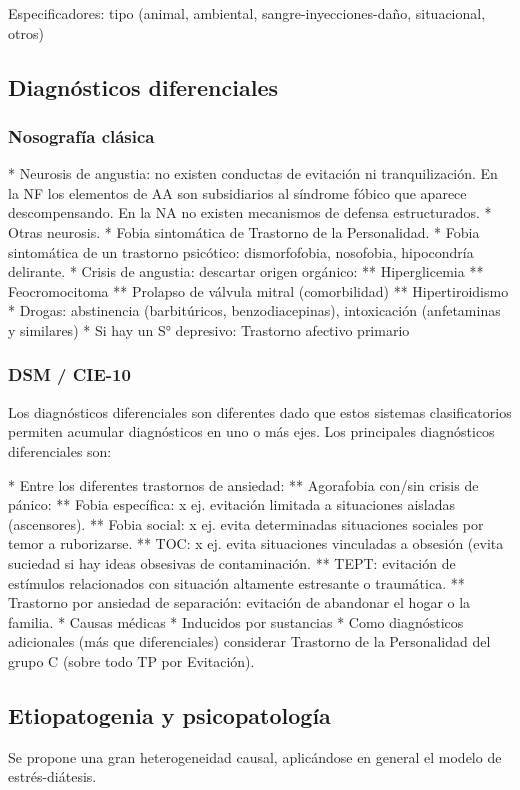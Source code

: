 \documentclass{scrbook}
\begin{document}
Especificadores: tipo (animal, ambiental, sangre-inyecciones-daño, situacional, otros)

\subsection*{Diagnósticos diferenciales}
\subsubsection*{Nosografía clásica}
* Neurosis de angustia: no existen conductas de evitación ni tranquilización. En la NF los elementos de AA son subsidiarios al síndrome fóbico que aparece descompensando. En la NA no existen mecanismos de defensa estructurados.
* Otras neurosis.
* Fobia sintomática de Trastorno de la Personalidad.
* Fobia sintomática de un trastorno psicótico: dismorfofobia, nosofobia, hipocondría delirante.
* Crisis de angustia: descartar origen orgánico:
** Hiperglicemia
** Feocromocitoma
** Prolapso de válvula mitral (comorbilidad)
** Hipertiroidismo
* Drogas: abstinencia (barbitúricos, benzodiacepinas), intoxicación (anfetaminas y similares)
* Si hay un S° depresivo: Trastorno afectivo primario
\subsubsection*{DSM / CIE-10}
Los diagnósticos diferenciales son diferentes dado que estos sistemas clasificatorios permiten acumular diagnósticos en uno o más ejes. Los principales diagnósticos diferenciales son:

* Entre los diferentes trastornos de ansiedad:
** Agorafobia con/sin crisis de pánico:
** Fobia específica: x ej. evitación limitada a situaciones aisladas (ascensores).
** Fobia social: x ej. evita determinadas situaciones sociales por temor a ruborizarse.
** TOC: x ej. evita situaciones vinculadas a obsesión (evita suciedad si hay ideas obsesivas de contaminación.
** TEPT: evitación de estímulos relacionados con situación altamente estresante o traumática.
** Trastorno por ansiedad de separación: evitación de abandonar el hogar o la familia.
* Causas médicas
* Inducidos por sustancias
* Como diagnósticos adicionales (más que diferenciales) considerar Trastorno de la Personalidad del grupo C (sobre todo TP por Evitación).
\subsection*{Etiopatogenia y psicopatología}
Se propone una gran heterogeneidad causal, aplicándose en general el modelo de estrés-diátesis.
\end{document}
